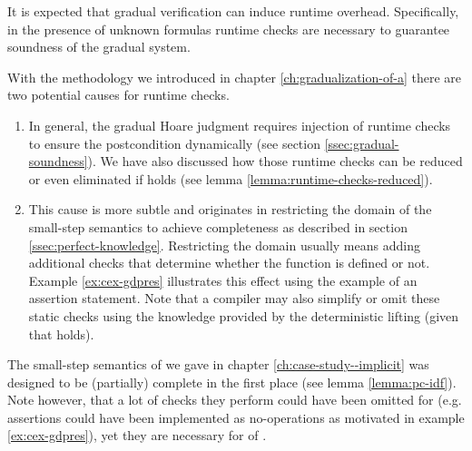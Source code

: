 It is expected that gradual verification can induce runtime overhead.
Specifically, in the presence of unknown formulas runtime checks are necessary to guarantee soundness of the gradual system.

With the methodology we introduced in chapter \ref{ch:gradualization-of-a} there are two potential causes for runtime checks.
\begin{enumerate}
    \item 
    In general, the gradual Hoare judgment requires injection of runtime checks to ensure the postcondition dynamically (see section \ref{ssec:gradual-soundness}).
    We have also discussed how those runtime checks can be reduced or even eliminated if  holds (see lemma \ref{lemma:runtime-checks-reduced}).
    \item 
    This cause is more subtle and originates in restricting the domain of the small-step semantics to achieve completeness as described in section \ref{ssec:perfect-knowledge}.
    Restricting the domain usually means adding additional checks that determine whether the function is defined or not.
    Example \ref{ex:cex-gdpres} illustrates this effect using the example of an assertion statement.
    Note that a compiler may also simplify or omit these static checks using the knowledge provided by the deterministic lifting (given that   holds).
\end{enumerate}

The small-step semantics of \svlidf we gave in chapter \ref{ch:case-study--implicit} was designed to be (partially) complete in the first place (see lemma \ref{lemma:pc-idf}).
Note however, that a lot of checks they perform could have been omitted for \svlidf (e.g. assertions could have been implemented as no-operations as motivated in example \ref{ex:cex-gdpres}), yet they are necessary for  of \gvlidf.

